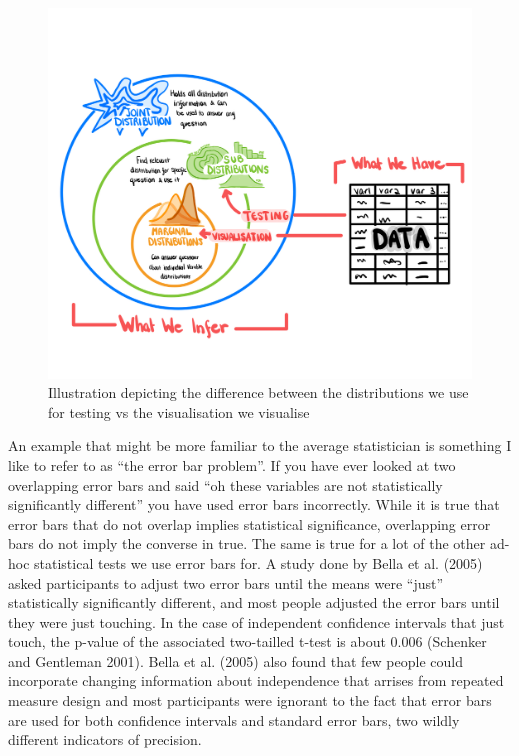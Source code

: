 \documentclass[
  letterpaper,
  DIV=11,
  numbers=noendperiod]{scrartcl}
\begin{document}
\begin{figure}

{\centering \includegraphics{incorrectdistributions.jpeg}

}

\caption{\label{fig-distdraw}Illustration depicting the difference
between the distributions we use for testing vs the visualisation we
visualise}

\end{figure}

An example that might be more familiar to the average statistician is
something I like to refer to as ``the error bar problem''. If you have
ever looked at two overlapping error bars and said ``oh these variables
are not statistically significantly different'' you have used error bars
incorrectly. While it is true that error bars that do not overlap
implies statistical significance, overlapping error bars do not imply
the converse in true. The same is true for a lot of the other ad-hoc
statistical tests we use error bars for. A study done by Bella et al.
(2005) asked participants to adjust two error bars until the means were
``just'' statistically significantly different, and most people adjusted
the error bars until they were just touching. In the case of independent
confidence intervals that just touch, the p-value of the associated
two-tailled t-test is about 0.006 (Schenker and Gentleman 2001). Bella
et al. (2005) also found that few people could incorporate changing
information about independence that arrises from repeated measure design
and most participants were ignorant to the fact that error bars are used
for both confidence intervals and standard error bars, two wildly
different indicators of precision.
\end{document}
